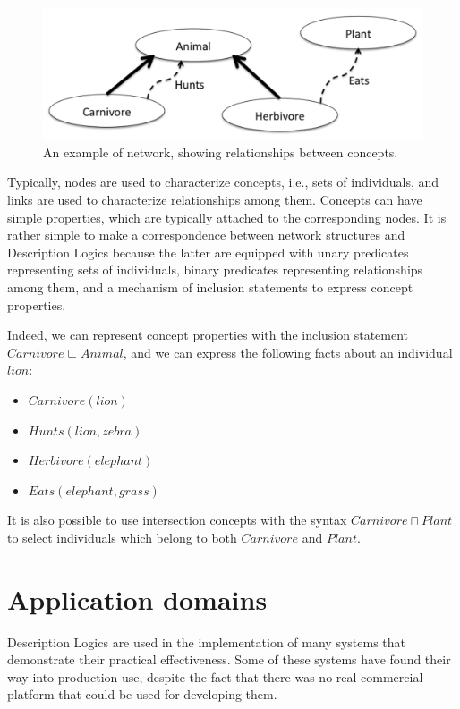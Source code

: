 \documentclass[a4paper, 11pt, oneside]{duthesis}
\begin{document}
\begin{figure}[htp]
\centering
\includegraphics[scale=.33]{img/relationship_network.png}
\caption{An example of network, showing relationships between concepts.}
\label{rel_net}
\end{figure}

Typically, nodes are used to characterize concepts, i.e., sets of individuals, and links are used to characterize relationships among them.
Concepts can have simple properties, which are typically attached to the corresponding nodes.
It is rather simple to make a correspondence between network structures and Description Logics because the latter are equipped with unary predicates representing sets of individuals, binary predicates representing relationships among them, and a mechanism of inclusion statements to express concept properties.

\newpage

Indeed, we can represent concept properties with the inclusion statement $Carnivore \sqsubseteq Animal$, and we can express the following facts about an individual $lion$: 

\begin{itemize}
	\item $Carnivore(lion)$
	\item $Hunts(lion, zebra)$
	\item $Herbivore(elephant)$
	\item $Eats(elephant, grass)$
\end{itemize}

It is also possible to use intersection concepts with the syntax $Carnivore \sqcap Plant$ to select individuals which belong to both $Carnivore$ and $Plant$.


\section{Application domains}
Description Logics are used in the implementation of many systems that demonstrate their practical effectiveness. Some of these systems have found their way into production use, despite the fact that there was no real commercial platform that could be used for developing them.\\
\end{document}
